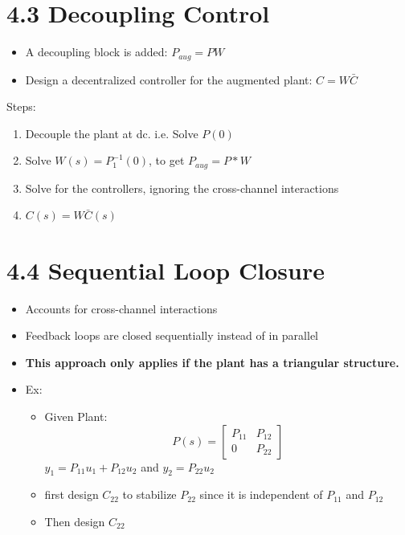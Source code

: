 \section*{4.3 Decoupling Control}
\begin{itemize}
    \item A decoupling block is added: \(P_{aug} = PW\)
    \item Design a decentralized controller for the augmented plant: \(C=W\bar{C}\)
\end{itemize}
Steps:
\begin{enumerate}
    \item Decouple the plant at dc. i.e. Solve \(P(0)\)
    \item Solve \(W(s)=P_1^{-1}(0)\), to get \( P_{aug} = P * W \)
    \item Solve for the controllers, ignoring the cross-channel interactions
    \item \(C(s) = W\bar{C}(s)\)
\end{enumerate}
\section*{4.4 Sequential Loop Closure}
\begin{itemize}
    \item Accounts for cross-channel interactions
    \item Feedback loops are closed sequentially instead of in parallel
    \item \textbf{This approach only applies if the plant has a triangular structure.}
    \item Ex:
          \begin{itemize}
              \item Given Plant:
                    \[
                        P(s) = \begin{bmatrix}
                            P_{11} & P_{12} \\
                            0      & P_{22}
                        \end{bmatrix}
                    \]
                    \(y_1 = P_{11}u_1 + P_{12}u_2\) and \(y_2 = P_{22}u_2\)
              \item first design \( C_{22} \) to stabilize \(P_22\) since it is independent of \( P_{11} \) and \( P_{12} \)
              \item Then design \( C_{22} \)
          \end{itemize}
\end{itemize}